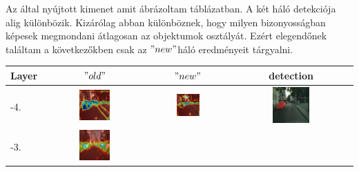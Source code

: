 \documentclass[12pt,oneside,a4paper]{article}
\theoremstyle{remark}
\newcommand{\oldh}{\( "old" \)}\label{makro2}
\newcommand{\newh}{\( "new" \)}
\begin{document}
    Az  által nyújtott kimenet amit ábrázoltam 
    táblázatban\label{hivatkozas}.
    A két háló detekciója alig különbözik.
    Kizárólag abban különböznek, hogy milyen bizonyosságban képesek megmondani átlagosan az objektumok osztályát.
    Ezért elegendőnek találtam a következőkben csak az \newh háló eredményeit tárgyalni.


\begin{table}[h!]

    \noindent\begin{tabular}{|p{}|c|c|c|}
        \hline
        \noindent Layer&\oldh & \newh & detection\\
        \hline
        -4.&\includegraphics[width=0.316\textwidth]{old_layer-4} &
        \includegraphics[width=0.316\textwidth]{new_l-4} &
        \includegraphics[width=0.316\textwidth]{img} \\
        \hline
        -3.&\includegraphics[width=0.316\textwidth]{old_layer-3} &

\end{tabular}
\end{table}
\end{document}
